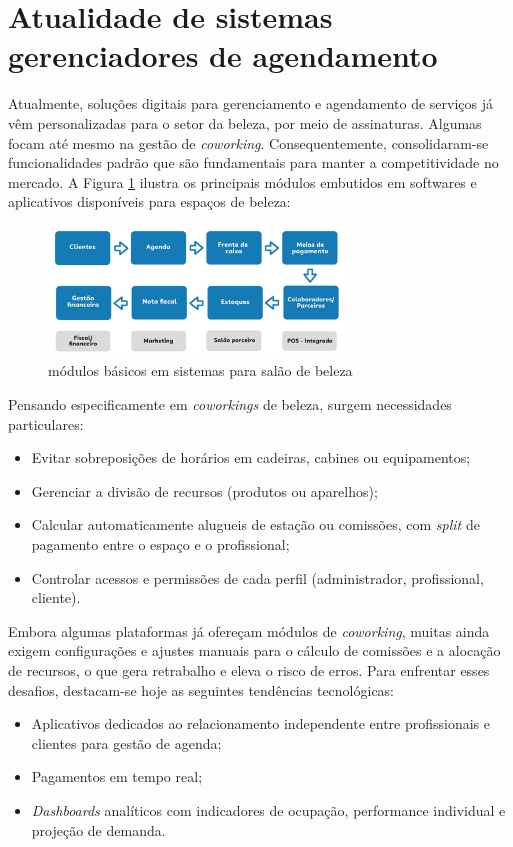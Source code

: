 \section{Atualidade de sistemas gerenciadores de agendamento}

Atualmente, soluções digitais para gerenciamento e agendamento de serviços já vêm personalizadas para o setor da beleza, por meio de assinaturas. Algumas focam até mesmo na gestão de \emph{coworking}. Consequentemente, consolidaram-se funcionalidades padrão que são fundamentais para manter a competitividade no mercado. A Figura \ref{fig:modulos} ilustra os principais módulos embutidos em softwares e aplicativos disponíveis para espaços de beleza:

\begin{figure}[htb]
	\centering
	\includegraphics[width=0.7\textwidth]{cap02-Revisao_literatura/Images/modulos_basicos_sistema}
	\caption{módulos básicos em sistemas para salão de beleza}
	\label{fig:modulos}
\end{figure}


Pensando especificamente em \emph{coworkings} de beleza, surgem necessidades particulares:
\begin{itemize}
	\item Evitar sobreposições de horários em cadeiras, cabines ou equipamentos;
	\item Gerenciar a divisão de recursos (produtos ou aparelhos);
	\item Calcular automaticamente alugueis de estação ou comissões, com \emph{split} de pagamento entre o espaço e o profissional;
	\item Controlar acessos e permissões de cada perfil (administrador, profissional, cliente).
\end{itemize}

Embora algumas plataformas já ofereçam módulos de \emph{coworking}, muitas ainda exigem configurações e ajustes manuais para o cálculo de comissões e a alocação de recursos, o que gera retrabalho e eleva o risco de erros. Para enfrentar esses desafios, destacam-se hoje as seguintes tendências tecnológicas:
\begin{itemize}
	\item Aplicativos dedicados ao relacionamento independente entre profissionais e clientes para gestão de agenda;
	\item Pagamentos em tempo real;
	\item \emph{Dashboards} analíticos com indicadores de ocupação, performance individual e projeção de demanda.
\end{itemize}

